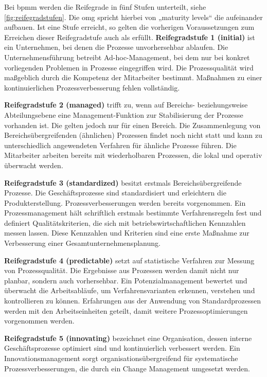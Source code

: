 Bei \acs{bpmm} werden die Reifegrade in fünf Stufen unterteilt, siehe \autoref{fig:reifegradstufen}. Die \acs{omg} spricht hierbei von „maturity levels“ die aufeinander aufbauen. Ist eine Stufe erreicht, so gelten die vorherigen Voraussetzungen zum Erreichen dieser Reifegradstufe auch als erfüllt.
\textbf{Reifegradstufe 1 (initial)} ist ein Unternehmen, bei denen die Prozesse unvorhersehbar ablaufen. Die Unternehmensführung betreibt Ad-hoc-Management, bei dem nur bei konkret vorliegenden Problemen in Prozesse eingegriffen wird. Die Prozessqualität wird maßgeblich durch die Kompetenz der Mitarbeiter bestimmt. Maßnahmen zu einer kontinuierlichen Prozessverbesserung fehlen vollständig.
\par
\textbf{Reifegradstufe 2 (managed)} trifft zu, wenn auf Bereichs- beziehungsweise Abteilungsebene eine Management-Funktion zur Stabilisierung der Prozesse vorhanden ist. Die gelten jedoch nur für einen Bereich. Die Zusammenlegung von Bereichsübergreifenden (ähnlichen) Prozessen findet noch nicht statt und kann zu unterschiedlich angewendeten Verfahren für ähnliche Prozesse führen. Die Mitarbeiter arbeiten bereits mit wiederholbaren Prozessen, die lokal und operativ überwacht werden.
\par
\textbf{Reifegradstufe 3 (standardized)} besitzt erstmals Bereichsübergreifende Prozesse. Die Geschäftsprozesse sind standardisiert und erleichtern die Produkterstellung. Prozessverbesserungen werden bereits vorgenommen. Ein Prozessmanagement hält schriftlich erstmals bestimmte Verfahrensregeln fest und definiert Qualitätskriterien, die sich mit betriebswirtschaftlichen Kennzahlen messen lassen. Diese Kennzahlen und Kriterien sind eine erste Maßnahme zur Verbesserung einer Gesamtunternehmensplanung.
\par
\textbf{Reifegradstufe 4 (predictable)} setzt auf statistische Verfahren zur Messung von Prozessqualität. Die Ergebnisse aus Prozessen werden damit nicht nur planbar, sondern auch vorhersehbar. Ein Potenzialmanagement bewertet und überwacht die Arbeitsabläufe, um Verfahrensvarianten erkennen, verstehen und kontrollieren zu können. Erfahrungen aus der Anwendung von Standardprozessen werden mit den Arbeitseinheiten geteilt, damit weitere Prozessoptimierungen vorgenommen werden.
\par
\textbf{Reifegradstufe 5 (innovating)} bezeichnet eine Organisation, dessen interne Geschäftsprozesse optimiert sind und kontinuierlich verbessert werden. Ein Innovationsmanagement sorgt organisationsübergreifend für systematische Prozessverbesserungen, die durch ein Change Management umgesetzt werden.
\par

